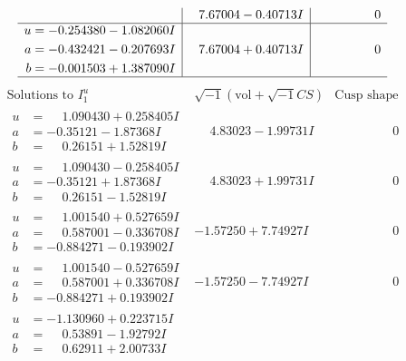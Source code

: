 \documentclass[1p]{elsarticle_modified}
\theoremstyle{definition}
\newcommand{\I}{\sqrt{-1}}
\begin{document}
$$\begin{array}{c|c|c}
 & \phantom{-}7.67004 - 0.40713 I & \phantom{-0.000000 } 0 \\ \hline\begin{aligned}
u &= -0.254380 - 1.082060 I \\
a &= -0.432421 - 0.207693 I \\
b &= -0.001503 + 1.387090 I\end{aligned}
 & \phantom{-}7.67004 + 0.40713 I & \phantom{-0.000000 } 0\\
 \hline 
 \end{array}$$\newpage$$\begin{array}{c|c|c}  
\text{Solutions to }I^u_{1}& \I (\text{vol} + \sqrt{-1}CS) & \text{Cusp shape}\\
 \hline 
\begin{aligned}
u &= \phantom{-}1.090430 + 0.258405 I \\
a &= -0.35121 - 1.87368 I \\
b &= \phantom{-}0.26151 + 1.52819 I\end{aligned}
 & \phantom{-}4.83023 - 1.99731 I & \phantom{-0.000000 } 0 \\ \hline\begin{aligned}
u &= \phantom{-}1.090430 - 0.258405 I \\
a &= -0.35121 + 1.87368 I \\
b &= \phantom{-}0.26151 - 1.52819 I\end{aligned}
 & \phantom{-}4.83023 + 1.99731 I & \phantom{-0.000000 } 0 \\ \hline\begin{aligned}
u &= \phantom{-}1.001540 + 0.527659 I \\
a &= \phantom{-}0.587001 - 0.336708 I \\
b &= -0.884271 - 0.193902 I\end{aligned}
 & -1.57250 + 7.74927 I & \phantom{-0.000000 } 0 \\ \hline\begin{aligned}
u &= \phantom{-}1.001540 - 0.527659 I \\
a &= \phantom{-}0.587001 + 0.336708 I \\
b &= -0.884271 + 0.193902 I\end{aligned}
 & -1.57250 - 7.74927 I & \phantom{-0.000000 } 0 \\ \hline\begin{aligned}
u &= -1.130960 + 0.223715 I \\
a &= \phantom{-}0.53891 - 1.92792 I \\
b &= \phantom{-}0.62911 + 2.00733 I\end{aligned}

\end{array}$$
\end{document}
